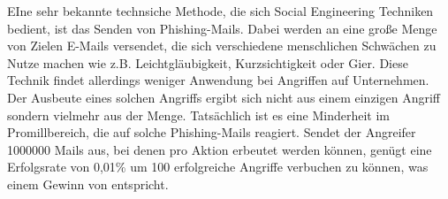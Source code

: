 EIne sehr bekannte technsiche Methode, die sich Social Engineering Techniken bedient, ist das Senden
von Phishing-Mails.
Dabei werden an eine große Menge von Zielen E-Mails versendet, die sich verschiedene menschlichen
Schwächen zu Nutze machen wie z.B. Leichtgläubigkeit, Kurzsichtigkeit oder Gier.
Diese Technik findet allerdings weniger Anwendung bei Angriffen auf Unternehmen.
Der Ausbeute eines solchen Angriffs ergibt sich nicht aus einem einzigen Angriff sondern vielmehr aus
der Menge.
Tatsächlich ist es eine Minderheit im Promillbereich, die auf solche Phishing-Mails reagiert.
Sendet der Angreifer 1000000 Mails aus, bei denen pro Aktion  erbeutet werden können, genügt
eine Erfolgsrate von 0,01\% um 100 erfolgreiche Angriffe verbuchen zu können, was einem Gewinn von
 entspricht.